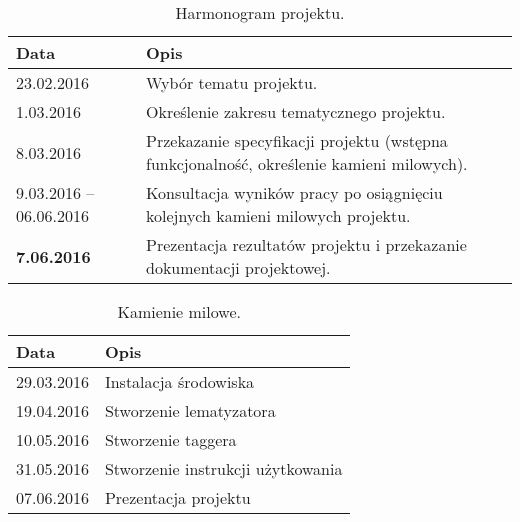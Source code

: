 \begin{table}[H]
	\centering
	\caption{Harmonogram projektu.}
	\smallskip
	\begin{tabular}{p{4cm}p{8cm}}
		\textbf{Data}& \textbf{Opis} \\\hline
		23.02.2016 & Wybór tematu projektu. \\\hline
		1.03.2016 & Określenie zakresu tematycznego projektu. \\\hline
		8.03.2016 & Przekazanie specyfikacji projektu (wstępna funkcjonalność, określenie kamieni milowych). \\\hline
		9.03.2016 -- 06.06.2016 & Konsultacja wyników pracy po osiągnięciu kolejnych kamieni milowych projektu. \\\hline
		\textbf{7.06.2016} & Prezentacja rezultatów projektu i przekazanie dokumentacji projektowej. \\\hline
	\end{tabular}
\end{table}

	\begin{table}[H]
	\centering
	\caption{Kamienie milowe.}
	\smallskip
	\begin{tabular}{p{4cm}p{8cm}}
		\textbf{Data}& \textbf{Opis} \\\hline
		29.03.2016 & Instalacja środowiska \\\hline
		19.04.2016 & Stworzenie lematyzatora \\\hline
		10.05.2016 & Stworzenie taggera \\\hline
		31.05.2016 & Stworzenie instrukcji użytkowania \\\hline
		07.06.2016 & Prezentacja projektu \\\hline
	\end{tabular}
\end{table}
